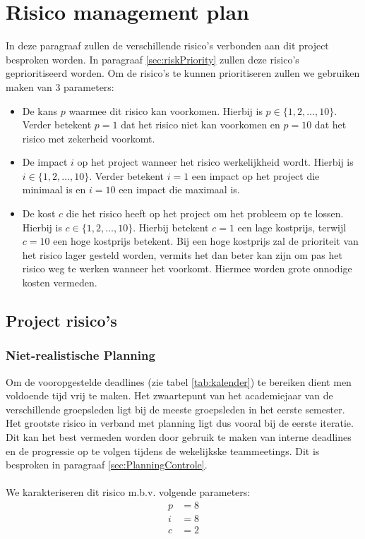 \section{Risico management plan} \label{sec:risicoManagementPlan}
In deze paragraaf zullen de verschillende risico's verbonden aan dit project besproken worden. In paragraaf \ref{sec:riskPriority} zullen deze risico's geprioritiseerd worden. Om de risico's te kunnen prioritiseren zullen we gebruiken maken van 3 parameters:
\begin{itemize}
	\item 
		De kans $p$ waarmee dit risico kan voorkomen. Hierbij is $ p \in \{1, 2, \ldots , 10\} $. Verder betekent $p = 1$ dat het risico niet kan voorkomen en $p = 10$ dat het risico met zekerheid voorkomt.
	\item 
		De impact $i$ op het project wanneer het risico werkelijkheid wordt. Hierbij is $ i \in \{1, 2, \ldots , 10\} $. Verder betekent $i = 1$ een impact op het project die minimaal is en $i = 10$ een impact die maximaal is.
	\item 
		De kost $c$ die het risico heeft op het project om het probleem op te lossen. Hierbij is $ c \in \{1, 2, \ldots , 10\} $. Hierbij betekent $c = 1$ een lage kostprijs, terwijl $c=10$ een hoge kostprijs betekent. Bij een hoge kostprijs zal de prioriteit van het risico lager gesteld worden, vermits het dan beter kan zijn om pas het risico weg te werken wanneer het voorkomt. Hiermee worden grote onnodige kosten vermeden.
		
\end{itemize}
\subsection{Project risico's}
\subsubsection{Niet-realistische Planning}
Om de vooropgestelde deadlines (zie tabel \ref{tab:kalender}) te bereiken dient men voldoende tijd vrij te maken. Het zwaartepunt van het academiejaar van de verschillende groepsleden ligt bij de meeste groepsleden in het eerste semester. Het grootste risico in verband met planning ligt dus vooral bij de eerste iteratie. Dit kan het best vermeden worden door gebruik te maken van interne deadlines en de progressie op te volgen tijdens de wekelijkske teammeetings. Dit is besproken in paragraaf \ref{sec:PlanningControle}.
\\
\\
We karakteriseren dit risico m.b.v. volgende parameters:
\begin{align*}
	p &= 8\\
	i &= 8\\
	c &= 2
\end{align*}

